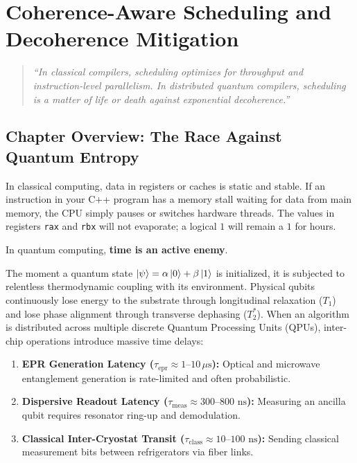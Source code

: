 \chapter{Coherence-Aware Scheduling and Decoherence Mitigation}
\label{ch:scheduling_decoherence}

\begin{quote}
\textit{``In classical compilers, scheduling optimizes for throughput and instruction-level parallelism. In distributed quantum compilers, scheduling is a matter of life or death against exponential decoherence.''}
\end{quote}

\section*{Chapter Overview: The Race Against Quantum Entropy}

In classical computing, data in registers or caches is static and stable. If an instruction in your C++ program has a memory stall waiting for data from main memory, the CPU simply pauses or switches hardware threads. The values in registers \texttt{rax} and \texttt{rbx} will not evaporate; a logical $1$ will remain a $1$ for hours.

In quantum computing, \textbf{time is an active enemy}. 

The moment a quantum state $\ket{\psi} = \alpha\ket{0} + \beta\ket{1}$ is initialized, it is subjected to relentless thermodynamic coupling with its environment. Physical qubits continuously lose energy to the substrate through longitudinal relaxation ($T_1$) and lose phase alignment through transverse dephasing ($T_2^*$). When an algorithm is distributed across multiple discrete Quantum Processing Units (QPUs), inter-chip operations introduce massive time delays:
\begin{enumerate}
    \item \textbf{EPR Generation Latency ($\tau_{\text{epr}} \approx 1\text{--}10\,\mu\text{s}$):} Optical and microwave entanglement generation is rate-limited and often probabilistic.
    \item \textbf{Dispersive Readout Latency ($\tau_{\text{meas}} \approx 300\text{--}800\text{ ns}$):} Measuring an ancilla qubit requires resonator ring-up and demodulation.
    \item \textbf{Classical Inter-Cryostat Transit ($\tau_{\text{class}} \approx 10\text{--}100\text{ ns}$):} Sending classical measurement bits between refrigerators via fiber links.
\end{enumerate}

